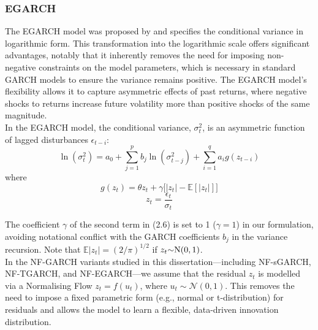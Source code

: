\documentclass[oneside,12pt]{CUEDthesisPSnPDF}
\newcommand{\E}{\mathbb{E}}
\newcommand{\textcite}{\citet}
\begin{document}
\subsubsection{EGARCH}
\noindent 
The EGARCH model was proposed by \textcite{nelson1991conditional} and specifies the conditional variance in logarithmic form. This transformation into the logarithmic scale offers significant advantages, notably that it inherently removes the need for imposing non-negative constraints on the model parameters, which is necessary in standard GARCH models to ensure the variance remains positive. The EGARCH model's flexibility allows it to capture asymmetric effects of past returns, where negative shocks to returns increase future volatility more than positive shocks of the same magnitude.\\

In the EGARCH model, the conditional variance, \(\sigma_t^2\), is an asymmetric function of lagged disturbances \(\epsilon_{t-i}\):\\

\begin{equation}
{\ln}(\sigma_t^2) =     
        a_0 +
        \sum_{j=1}^p b_j {\ln}(\sigma_{t-j}^2) +
        \sum_{i=1}^q a_i g( z_{t-i}) 
\end{equation}
where
\[
g(z_{t}) = {\theta} z_{t} + 
            {\gamma \bigl[{| z_{t}|} - 
            \E[| z_{t}|]\bigr]}
\]
\vspace{8pt}
\[
z_{t} = \frac{\epsilon_{t}}{\sigma_{t}}
\]

The coefficient \(\gamma\) of the second term in (2.6) is set to 1 (\(\gamma = 1\)) in our formulation, avoiding notational conflict with the GARCH coefficients \(b_j\) in the variance recursion. Note that \({\E{|z_{t}|} = (2 / {\pi}) ^{1/2}} \) if \({z_{t} {\sim} \rm{N}(0,1)}\).\\

In the NF-GARCH variants studied in this dissertation—including NF-sGARCH, NF-TGARCH, and NF-EGARCH—we assume that the residual \( z_t \) is modelled via a Normalising Flow \( z_t = f(u_t) \), where \( u_t \sim \mathcal{N}(0,1) \). This removes the need to impose a fixed parametric form (e.g., normal or t-distribution) for residuals and allows the model to learn a flexible, data-driven innovation distribution.\\
\end{document}
